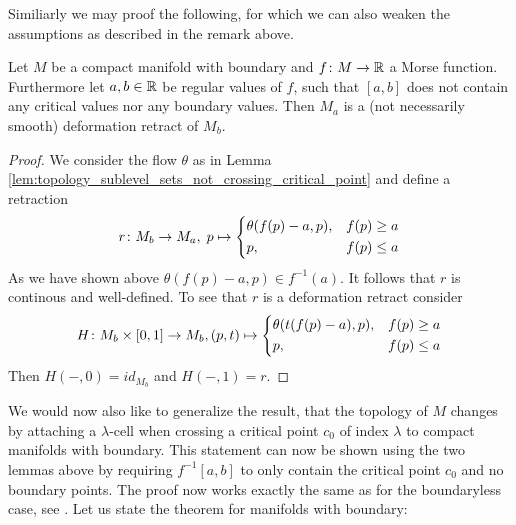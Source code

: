     Similiarly we may proof the following, for which we can also weaken the assumptions as described in the remark above.

    \begin{lemma}
        \label{lem:topology_sublevel_sets_not_crossing_critical_point_variation}
        Let $M$ be a compact manifold with boundary and $f \colon M \to \mathbb{R}$ a Morse function. Furthermore let $a,b \in \mathbb{R}$ be regular values of $f$, such that $[a,b]$ does not contain any critical values nor any boundary values. Then 
        $M_a$ is a (not necessarily smooth) deformation retract of $M_b$.
    \end{lemma}
    \begin{proof}
        We consider the flow $\theta$ as in Lemma \ref{lem:topology_sublevel_sets_not_crossing_critical_point} and define a retraction
        \[
            r \colon M_b \to M_a, \; p \mapsto \begin{dcases}
            \theta(f(p) - a,p), & f(p) \geq a \\
            p, & f(p) \leq a
        \end{dcases}
        \]
        As we have shown above $\theta(f(p) - a,p) \in f^{-1}(a)$. It follows that $r$ is continous and well-defined. To see that $r$ is a deformation retract consider
        \[
        H \colon M_b \times [0,1] \to M_b, (p,t) \mapsto \begin{dcases}
            \theta(t(f(p) - a),p), & f(p) \geq a \\
            p, & f(p) \leq a
        \end{dcases}
        \]
        Then $H(-,0) = id_{M_b}$ and $H(-,1) = r$.
    \end{proof}

    We would now also like to generalize the result, that the topology of $M$ changes by attaching a $\lambda$-cell when crossing a critical point $c_0$ of index $\lambda$ to compact manifolds with boundary. This statement can now be shown using the two lemmas above by requiring $f^{-1}[a,b]$ to only contain the critical point $c_0$ and no boundary points. The proof now works exactly the same as for the boundaryless case, see \cite{milnor1963morse}. Let us state the theorem for manifolds with boundary:
    
